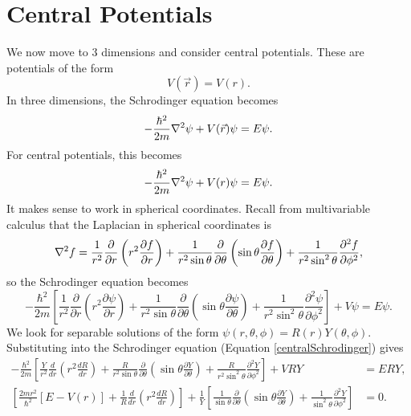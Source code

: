 \section{Central Potentials}
We now move to 3 dimensions and consider central potentials. These are potentials of the form 
\[V(\vec{r}) = V(r). \]
In three dimensions, the Schrodinger equation becomes 
\begin{equation}
-\frac{\hbar^2}{2m} \nabla^2 \psi + V(\vec{r}) \psi  = E\psi 
\label{3DSchrodinger}.
\end{equation}
For central potentials, this becomes 
\begin{equation}
-\frac{\hbar^2}{2m} \nabla^2 \psi + V(r) \psi  = E\psi .
\end{equation}
It makes sense to work in spherical coordinates. Recall from multivariable calculus that the Laplacian in spherical coordinates is 
\begin{equation}
    \nabla^2 f = \frac{1}{r^2} \frac{\partial}{\partial r} \left(r^2 \frac{\partial f}{\partial r} \right) + \frac{1}{r^2 \sin \theta} \frac{\partial}{\partial \theta} \left(\sin \theta \frac{\partial f}{\partial \theta} \right) + \frac{1}{r^2 \sin^2 \theta} \frac{\partial^2 f}{\partial \phi^2},
\end{equation}
so the Schrodinger equation becomes 
\begin{equation}
    -\frac{\hbar^2}{2m} \left[\frac{1}{r^2} \frac{\partial}{\partial r} \left(r^2 \frac{\partial \psi}{\partial r} \right) + \frac{1}{r^2 \sin \theta} \frac{\partial}{\partial \theta} \left(\sin \theta \frac{\partial \psi}{\partial \theta} \right) + \frac{1}{r^2 \sin^2 \theta} \frac{\partial^2 \psi}{\partial \phi^2} \right] + V\psi = E\psi.
    \label{centralSchrodinger}
\end{equation}
We look for separable solutions of the form $\psi(r,\theta,\phi) = R(r) Y(\theta,\phi).$
Substituting into the Schrodinger equation (Equation \ref{centralSchrodinger}) gives 
\begin{align*}
      -\frac{\hbar^2}{2m} \left[\frac{Y}{r^2} \frac{d}{dr} \left(r^2 \frac{dR}{dr} \right) + \frac{R}{r^2 \sin \theta} \frac{\partial}{\partial \theta} \left(\sin \theta \frac{\partial Y}{\partial \theta} \right) + \frac{R}{r^2 \sin^2 \theta} \frac{\partial^2 Y}{\partial \phi^2} \right] + VRY &= ERY,\\
      \left[\frac{2mr^2}{\hbar^2} [E-V(r)] + \frac{1}{R} \frac{d}{dr} \left(r^2 \frac{dR}{dr} \right)\right] + \frac{1}{Y}\left[\frac{1}{\sin \theta} \frac{\partial}{\partial \theta} \left( \sin \theta \frac{\partial Y}{\partial \theta}\right)+\frac{1}{\sin^2 \theta} \frac{\partial^2 Y}{\partial \phi^2} \right]&= 0.
\end{align*}
